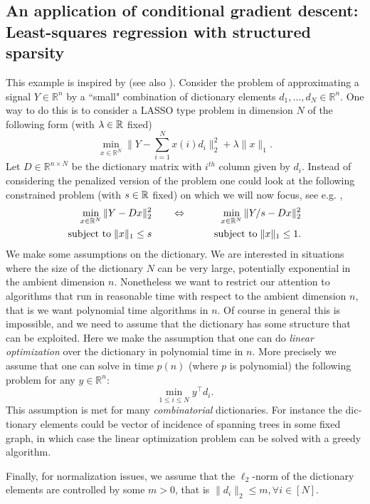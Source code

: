 \subsection*{An application of conditional gradient descent: Least-squares regression with structured sparsity}
This example is inspired by \cite{Lug10} (see also \cite{Jon92}). Consider the problem of approximating a signal $Y \in \mathbb{R}^n$ by a ``small" combination of dictionary elements $d_1, \hdots, d_N \in \mathbb{R}^n$. One way to do this is to consider a LASSO type problem in dimension $N$ of the following form (with $\lambda \in \mathbb{R}$ fixed)
$$\min_{x \in \mathbb{R}^N} \big\| Y - \sum_{i=1}^N x(i) d_i \big\|_2^2 + \lambda \|x\|_1 .$$
Let $D \in \mathbb{R}^{n \times N}$ be the dictionary matrix with $i^{th}$ column given by $d_i$. Instead of considering the penalized version of the problem one could look at the following constrained problem (with $s \in \mathbb{R}$ fixed) on which we will now focus, see e.g. \cite{FT07},
\begin{eqnarray}
\min_{x \in \mathbb{R}^N} \| Y - D x \|_2^2 
& \qquad \Leftrightarrow \qquad & \min_{x \in \mathbb{R}^N} \| Y / s - D x \|_2^2 \label{eq:structuredsparsity} \\
\text{subject to}  \; \|x\|_1 \leq s
& & \text{subject to} \; \|x\|_1 \leq 1 . \notag
\end{eqnarray}
We make some assumptions on the dictionary. We are interested in situations where the size of the dictionary $N$ can be very large, potentially exponential in the ambient dimension $n$. Nonetheless we want to restrict our attention to algorithms that run in reasonable time with respect to the ambient dimension $n$, that is we want polynomial time algorithms in $n$. Of course in general this is impossible, and we need to assume that the dictionary has some structure that can be exploited. Here we make the assumption that one can do {\em linear optimization} over the dictionary in polynomial time in $n$. More precisely we assume that one can solve in time $p(n)$ (where $p$ is polynomial) the following problem for any $y \in \mathbb{R}^n$:
$$\min_{1 \leq i \leq N} y^{\top} d_i .$$
This assumption is met for many {\em combinatorial} dictionaries. For instance the dic­tio­nary ele­ments could be vec­tor of inci­dence of span­ning trees in some fixed graph, in which case the lin­ear opti­miza­tion prob­lem can be solved with a greedy algorithm.

Finally, for normalization issues, we assume that the $\ell_2$-norm of the dictionary elements are controlled by some $m>0$, that is $\|d_i\|_2 \leq m, \forall i \in [N]$.

